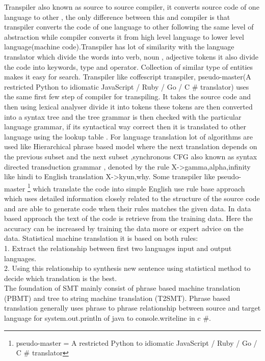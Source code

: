 \documentclass[23pt]{article}
\begin{document}
{\Large Transpiler also known as source to source compiler, it converts source code of one language to other , the only difference between this and compiler is that transpiler converts the code of one language to other following the same level of abstraction while compiler converts it from high level language to lower level language(machine code).Transpiler has lot of similarity with the language translator which divide the words into verb, noun , adjective tokens it also divide the code into keywords, type and operator. Collection of similar type of entities makes it easy for search.
Transpiler like coffescript transpiler, pseudo-master(A restricted Python to idiomatic JavaScript / Ruby / Go / C \# translator)  uses the same first few step of compiler for transpiling. It takes the source code and then using lexical analyser divide it into tokens these tokens are then converted into a syntax tree and the tree grammar is then checked with the particular language grammar, if its syntactical way correct then it is translated to other language using the lookup table \cite{pseudo} \cite{coffeescript}. For language translation lot of algorithms are used like Hierarchical phrase based model where the next translation depends on the previous subset and the next subset ,synchronous CFG also known as syntax directed transduction grammar , denoted by the rule X->{gamma,alpha,infinity} like hindi to English translation X->{kyun,why}\cite{phrase}. Some transpiler like pseudo-master \footnote{ pseudo-master = A restricted Python to idiomatic JavaScript / Ruby / Go / C \# translator } which translate the code into simple English use rule base approach which uses detailed information closely related to the structure of the source code and are able to generate code when their rules matches the given data. In data based approach the text of the code is retrieve from the training data. Here the accuracy can be increased by training the data more or expert advice on the data. Statistical machine translation it is based on both rules: \\ 1.	 Extract the relationship between first two languages input and output languages. \\
2. Using this relationship to synthesis new sentence using statistical method to decide which translation is the best. \\
The foundation of SMT mainly consist of phrase based machine translation (PBMT) and tree to string machine translation (T2SMT). Phrase based translation generally uses phrase to phrase relationship between source and target language for system.out.println of java to console.writeline in c \#.
}
\end{document}
